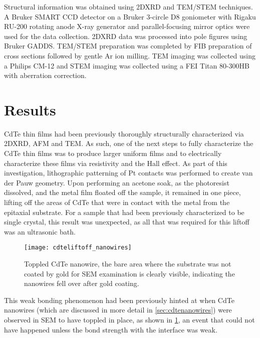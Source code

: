 Structural information was obtained using 2DXRD and TEM/STEM techniques.
A Bru\-ker SMART CCD detector on a Bruker 3-circle D8 goniometer with Rigaku RU-200 rotating anode X-ray generator and parallel-focusing mirror optics were used for the data collection.
2DXRD data was processed into pole figures using Bruker GADDS\@.
TEM/STEM preparation was completed by FIB preparation of cross sections followed by gentle Ar ion milling.
TEM imaging was collected using a Philips CM-12 and STEM imaging was collected using a FEI Titan 80-300HB with aberration correction.
\section{Results}
CdTe thin films had been previously thoroughly structurally characterized via 2DXRD, AFM and TEM\@. As such, one of the next steps to fully characterize the CdTe thin films was to produce larger uniform films\cite{stephen-thesis} and to electrically characterize these films via resistivity and the Hall effect.
As part of this investigation, lithographic patterning of Pt contacts was performed to create van der Pauw geometry.
Upon performing an acetone soak, as the photoresist dissolved, and the metal film floated off the sample, it remained in one piece, lifting off the areas of CdTe that were in contact with the metal from the epitaxial substrate.
For a sample that had been previously characterized to be single crystal, this result was unexpected, as all that was required for this liftoff was an ultrasonic bath.
\begin{figure}
 \centering \texttt{[image: cdteliftoff\_nanowires]}
 \caption[Toppled CdTe nanowire]{\label{fig:cdteliftoff_nanowires}Toppled CdTe nanowire, the bare area where the substrate was not coated by gold for SEM examination is clearly visible, indicating the nanowires fell over after gold coating.}
\end{figure}
This weak bonding phenomenon had been previously hinted at when CdTe nanowires (which are discussed in more detail in \cref{sec:cdtenanowires}) were observed in SEM to have toppled in place, as shown in \cref{fig:cdteliftoff_nanowires}, an event that could not have happened unless the bond strength with the interface was weak.

